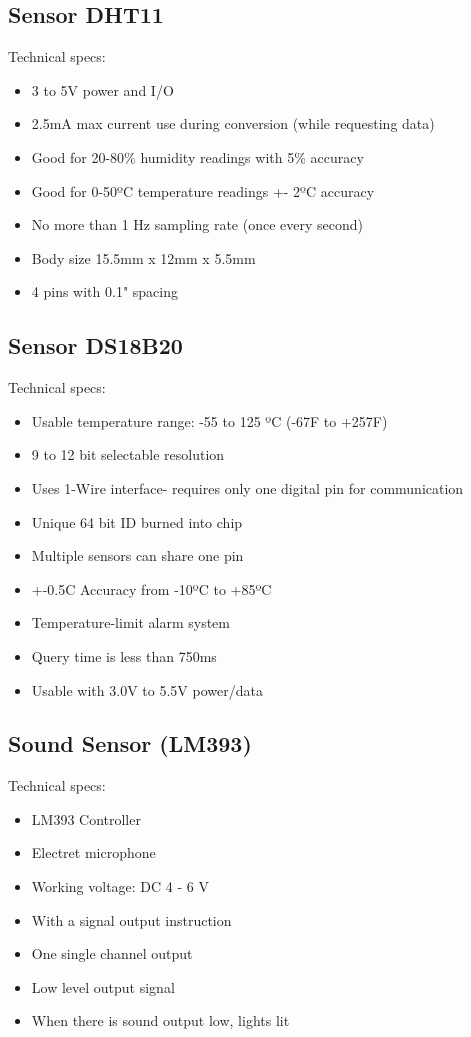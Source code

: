 \documentclass[12pt]{report}
\begin{document}
\begin{appendices}
\subsection*{Sensor DHT11}
Technical specs:
\begin{itemize}
\item 3 to 5V power and I/O
\item 2.5mA max current use during conversion (while requesting data)
\item Good for 20-80\% humidity readings with 5\% accuracy
\item Good for 0-50ºC temperature readings +- 2ºC accuracy
\item No more than 1 Hz sampling rate (once every second)
\item Body size 15.5mm x 12mm x 5.5mm
\item 4 pins with 0.1" spacing
\end{itemize}

\subsection*{Sensor DS18B20}
Technical specs:
\begin{itemize}
\item Usable temperature range: -55 to 125 ºC (-67F to +257F)
\item 9 to 12 bit selectable resolution
\item Uses 1-Wire interface- requires only one digital pin for communication
\item Unique 64 bit ID burned into chip
\item Multiple sensors can share one pin
\item +-0.5C Accuracy from -10ºC to +85ºC
\item Temperature-limit alarm system
\item Query time is less than 750ms
\item Usable with 3.0V to 5.5V power/data
\end{itemize}
\subsection*{Sound Sensor (LM393)}
Technical specs:
\begin{itemize}
\item LM393 Controller
\item Electret microphone
\item Working voltage: DC 4 - 6 V
\item With a signal output instruction
\item One single channel output
\item Low level output signal
\item When there is sound output low, lights lit
\end{itemize}

\end{appendices}
\end{document}
